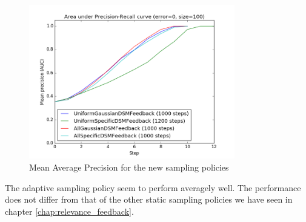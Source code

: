 \begin{figure}[h!]
  \centering
  \includegraphics[width=0.8\textwidth]{otago}
  \caption{Mean Average Precision for the new sampling policies}
  \label{fig:pms_grand}
\end{figure}

The adaptive sampling policy seem to perform averagely well. The performance
does not differ from that of the other static sampling policies we have seen in
chapter \ref{chap:relevance_feedback}.

